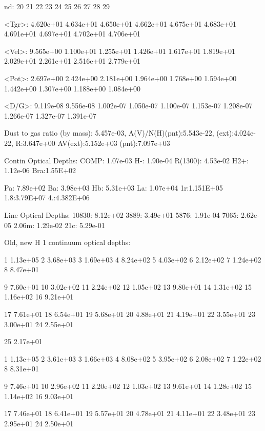 {    nd:     20           21           22           23           24     
25           26           27           28           29   

 <Tgr>: 4.620e+01    4.634e+01    4.650e+01    4.662e+01    4.675e+01  
4.683e+01    4.691e+01    4.697e+01    4.702e+01    4.706e+01

 <Vel>: 9.565e+00    1.100e+01    1.255e+01    1.426e+01    1.617e+01  
1.819e+01    2.029e+01    2.261e+01    2.516e+01    2.779e+01

 <Pot>: 2.697e+00    2.424e+00    2.181e+00    1.964e+00    1.768e+00  
1.594e+00    1.442e+00    1.307e+00    1.188e+00    1.084e+00

 <D/G>: 9.119e-08    9.556e-08    1.002e-07    1.050e-07    1.100e-07  
1.153e-07    1.208e-07    1.266e-07    1.327e-07    1.391e-07

 Dust to gas ratio (by mass): 5.457e-03, A(V)/N(H)(pnt):5.543e-22,
(ext):4.024e-22, R:3.647e+00 AV(ext):5.152e+03 (pnt):7.097e+03


 Contin Optical Depths: COMP: 1.07e-03     H-: 1.90e-04     R(1300): 4.53e-02
H2+: 1.12e-06  Bra:1.55E+02

                        Pa: 7.89e+02    Ba: 3.98e+03      Hb: 5.31e+03 
La: 1.07e+04     1r:1.151E+05  1.8:3.79E+07 4.:4.382E+06

  Line Optical Depths: 10830:  8.12e+02  3889: 3.49e+01    5876: 1.91e-04
7065: 2.62e-05  2.06m: 1.29e-02  21c: 5.29e-01


Old, new H  1 continuum optical depths:

     1 1.13e+05     2 3.68e+03     3 1.69e+03     4 8.24e+02     5 4.03e+02
6 2.12e+02     7 1.24e+02     8 8.47e+01

     9 7.60e+01    10 3.02e+02    11 2.24e+02    12 1.05e+02    13 9.80e+01
14 1.31e+02    15 1.16e+02    16 9.21e+01

    17 7.61e+01    18 6.54e+01    19 5.68e+01    20 4.88e+01    21 4.19e+01
22 3.55e+01    23 3.00e+01    24 2.55e+01

    25 2.17e+01

     1 1.13e+05     2 3.61e+03     3 1.66e+03     4 8.08e+02     5 3.95e+02
6 2.08e+02     7 1.22e+02     8 8.31e+01

     9 7.46e+01    10 2.96e+02    11 2.20e+02    12 1.03e+02    13 9.61e+01
14 1.28e+02    15 1.14e+02    16 9.03e+01

    17 7.46e+01    18 6.41e+01    19 5.57e+01    20 4.78e+01    21 4.11e+01
22 3.48e+01    23 2.95e+01    24 2.50e+01

}
